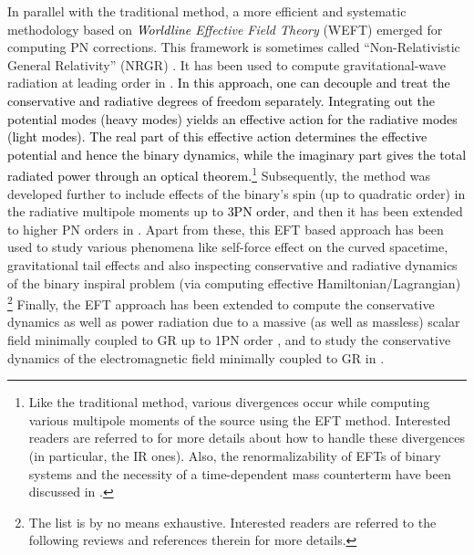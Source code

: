 In parallel with the traditional method, a more efficient and systematic methodology based on \textit{\textcolor{black}{Worldline} Effective Field Theory} (WEFT) emerged for computing PN corrections. This framework is sometimes called ``Non-Relativistic General Relativity'' (NRGR) \cite{Goldberger:2004jt}. It has been used to compute gravitational-wave radiation at leading order in \cite{Goldberger:2004jt}. \textcolor{black}{In this approach, one can decouple and treat the conservative and radiative degrees of freedom separately. Integrating out the potential modes (heavy modes) yields an effective action for the radiative modes (light modes). The real part of this effective action determines the effective potential and hence the binary dynamics, while the imaginary part gives the total radiated power through an optical theorem.}\footnote{Like the traditional method, various divergences occur while computing various multipole moments of the source using the EFT method. Interested readers are referred to \cite{Porto:2017dgs,Porto:2007pw} for more details about how to handle these divergences (in particular, the IR ones). Also, the renormalizability of EFTs of binary systems and the necessity of a time-dependent mass counterterm have been discussed in \cite{Goldberger:2012kf,Galley:2015kus}.} Subsequently, the method was developed further to include effects of the binary's spin (up to quadratic order) in the radiative multipole moments up to \cite{Porto:2010zg} 
\textcolor{black}{3PN order}, and then it has been extended to higher PN  orders in \cite{Levi:2011eq, Levi:2015uxa, Levi:2015ixa, Levi:2014sba}. Apart from these, this EFT based approach has been used to study various phenomena like self-force effect on the curved spacetime, gravitational tail effects and also inspecting conservative and radiative dynamics of the binary inspiral problem (via computing effective Hamiltonian/Lagrangian) \cite{Maia:2017gxn,Maia:2017yok,Foffa:2019yfl,Kalin:2022hph,Porto:2008jj,Porto:2008tb,Porto:2007px,Mandal:2022nty,Mandal:2022ufb,Goldberger:2009qd,Ross:2012fc,Goldberger:2020fot,Goldberger:2017ogt,Goldberger:2006bd,Goldberger:2005cd}
\footnote{The list is by no means exhaustive. Interested readers are referred to the following reviews \cite{Goldberger:2022rqf,Goldberger:2022ebt} and references therein for more details.}
 Finally, the EFT approach has been extended to compute the conservative dynamics as well as power radiation due to a massive (as well as massless) scalar field minimally coupled to GR up to 1PN order \cite{Kuntz:2019zef,Huang:2018pbu}, and to study the conservative dynamics of the electromagnetic field minimally coupled to GR in \cite{Patil:2020dme,Gupta:2022spq}.
